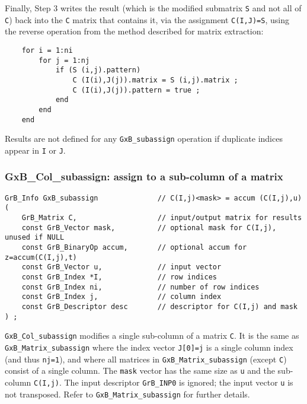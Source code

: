\documentclass[12pt]{article}
\begin{document}
Finally, Step 3 writes the result (which is the modified submatrix \verb'S' and
not all of \verb'C') back into the \verb'C' matrix that contains it, via the
assignment \verb'C(I,J)=S', using the reverse operation from the method
described for matrix extraction:

    {\footnotesize
    \begin{verbatim}
    for i = 1:ni
        for j = 1:nj
            if (S (i,j).pattern)
                C (I(i),J(j)).matrix = S (i,j).matrix ;
                C (I(i),J(j)).pattern = true ;
            end
        end
    end \end{verbatim}}

Results are not defined for any \verb'GxB_subassign' operation if duplicate
indices appear in \verb'I' or \verb'J'.

\newpage
\subsubsection{{\sf GxB\_Col\_subassign:} assign to a sub-column of a matrix}
\label{subassign_column}

\begin{mdframed}[userdefinedwidth=6in]
{\footnotesize
\begin{verbatim}
GrB_Info GxB_subassign              // C(I,j)<mask> = accum (C(I,j),u)
(
    GrB_Matrix C,                   // input/output matrix for results
    const GrB_Vector mask,          // optional mask for C(I,j), unused if NULL
    const GrB_BinaryOp accum,       // optional accum for z=accum(C(I,j),t)
    const GrB_Vector u,             // input vector
    const GrB_Index *I,             // row indices
    const GrB_Index ni,             // number of row indices
    const GrB_Index j,              // column index
    const GrB_Descriptor desc       // descriptor for C(I,j) and mask
) ;
\end{verbatim} } \end{mdframed}

\verb'GxB_Col_subassign' modifies a single sub-column of a matrix \verb'C'.  It
is the same as \verb'GxB_Matrix_subassign' where the index vector \verb'J[0]=j'
is a single column index (and thus \verb'nj=1'), and where all matrices in
\verb'GxB_Matrix_subassign' (except \verb'C') consist of a single column.  The
\verb'mask' vector has the same size as \verb'u' and the sub-column
\verb'C(I,j)'.  The input descriptor \verb'GrB_INP0' is ignored; the input
vector \verb'u' is not transposed.  Refer to \verb'GxB_Matrix_subassign' for
further details.
\end{document}
